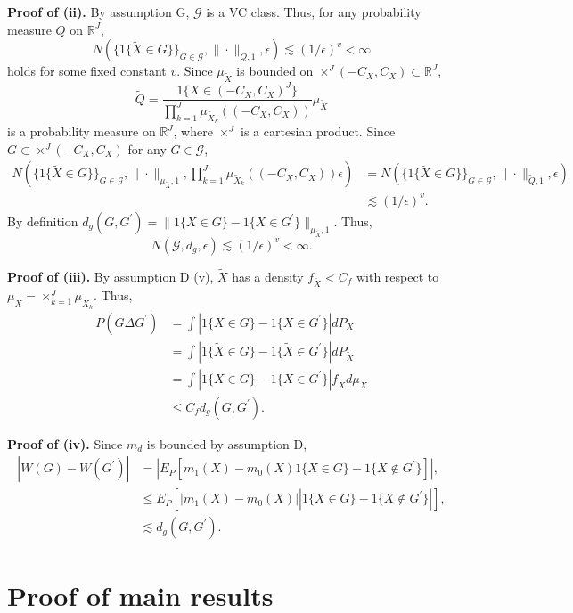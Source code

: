 \documentclass[12pt,oneside,reqno,english]{amsart}
\theoremstyle{definition}
\begin{document}
\textbf{Proof of (ii).}
By assumption G, $\mathcal{G}$ is a VC class. Thus, for any probability measure $Q$ on $\mathbb{R}^{J}$, 
\[N(\{1\{\tilde{X}\in G\}\}_{G\in \mathcal{G}},\|\cdot\|_{Q,1},\epsilon)\lesssim (1/\epsilon)^{v}<\infty\]
holds for some fixed constant $v$. 
Since $\mu_{\tilde{X}}$ is bounded on $\times^{J}(-C_{X},C_{X})\subset \mathbb{R}^{J}$,  
\[\tilde{Q}=\frac{1\{X\in (-C_{X},C_{X})^{J}\}}{\prod_{k=1}^{J}\mu_{\tilde{X}_{k}}((-C_{X},C_{X}))}\mu_{\tilde{X}}\]
is a probability measure on $\mathbb{R}^{J}$, where $\times^{J}$ is a cartesian product. 
Since $G\subset \times^{J}(-C_{X},C_{X})$ for any $G\in \mathcal{G}$, 
\begin{align*}
N\left(\{1\{\tilde{X}\in G\}\}_{G\in \mathcal{G}},\|\cdot\|_{\mu_{\tilde{X}},1},\prod_{k=1}^{J}\mu_{\tilde{X}_{k}}((-C_{X},C_{X}))\epsilon\right)
&=N(\{1\{\tilde{X}\in G\}\}_{G\in \mathcal{G}},\|\cdot\|_{\tilde{Q},1},\epsilon)\\
&\lesssim (1/\epsilon)^{v}.
\end{align*}
By definition $d_{g}(G,G^{\prime})=\|1\{X\in G\}-1\{X\in G^{\prime}\} \|_{\mu_{\tilde{X}},1}$. 
Thus, 
\[N(\mathcal{G},d_{g},\epsilon)\lesssim (1/\epsilon)^{v}<\infty.\]

\textbf{Proof of (iii).} By assumption D (v), $\tilde{X}$ has a density $f_{\tilde{X}}<C_{f}$ with respect to $\mu_{\tilde{X}}=\times_{k=1}^{J}\mu_{\tilde{X}_{k}}$. 
Thus, 
\begin{align*}
P(G\Delta G^{\prime})&=\int |1\{X\in G\}-1\{X\in G^{\prime}\}|dP_{X}\\
&=\int |1\{\tilde{X}\in G\}-1\{\tilde{X}\in G^{\prime}\}|dP_{\tilde{X}}\\
&= \int |1\{X\in G\}-1\{X\in G^{\prime}\}|f_{\tilde{X}} d\mu_{\tilde{X}}\\
&\leq C_{f}d_{g}(G,G^{\prime}).
\end{align*}

\textbf{Proof of (iv).} Since $m_{d}$ is bounded by assumption D, 
\begin{align*}
|W(G)-W(G^{\prime})|&=\left|E_{P}[ m_{1}(X)-m_{0}(X)1\{X\in G\}-1\{X\not\in G^{\prime}\}]\right|,\\
&\leq E_{P}[\left| m_{1}(X)-m_{0}(X)\right|\left|1\{X\in G\}-1\{X\not\in G^{\prime}\}\right|],\\
&\lesssim d_{g}(G,G^{\prime}).
\end{align*}


\section{Proof of main results}
\end{document}
